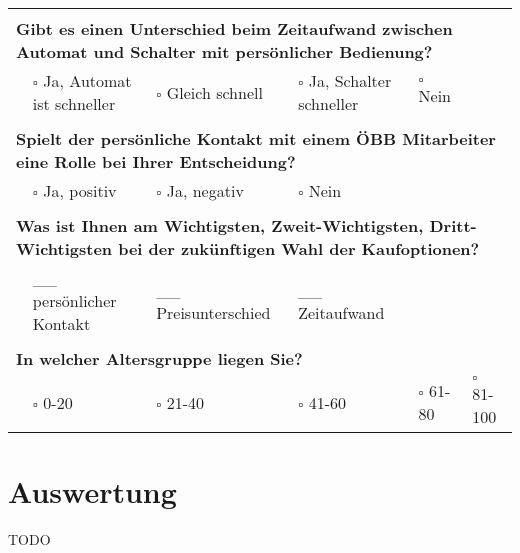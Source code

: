 \documentclass[]{article}
\begin{document}
\begin{landscape}
\begin{table}[h!]
\begin{tabular}{|llllll|}
		& & & & & \\ \hline
		& & & & & \\
		\multicolumn{6}{|l|}{\textbf{Gibt es einen Unterschied beim Zeitaufwand zwischen Automat und Schalter mit persönlicher Bedienung?}} \\ \hline
		& $\square$ Ja, Automat ist schneller & $\square$ Gleich schnell & $\square$ Ja, Schalter schneller & $\square$ Nein  &             \\ \hline
		& & & & & \\
		\multicolumn{6}{|l|}{\textbf{Spielt der persönliche Kontakt mit einem ÖBB Mitarbeiter eine Rolle bei Ihrer Entscheidung?}}          \\ \hline
		& $\square$ Ja, positiv & $\square$ Ja, negativ & $\square$ Nein &  &                                                               \\ \hline
		& & & & & \\
		\multicolumn{6}{|l|}{\textbf{Was ist Ihnen am Wichtigsten, Zweit-Wichtigsten, Dritt-Wichtigsten bei der zukünftigen Wahl der Kaufoptionen?}} \\ \hline
		& \_\_ persönlicher Kontakt       & \_\_ Preisunterschied          & \_\_ Zeitaufwand             &  &                              \\ \hline
		& & & & & \\
		\multicolumn{6}{|l|}{\textbf{In welcher Altersgruppe liegen Sie?}}                                                                  \\ \hline
		& $\square$ 0-20 & $\square$ 21-40 & $\square$ 41-60 & $\square$ 61-80 & $\square$ 81-100                                           \\ \hline
	\end{tabular}
\end{table}

\end{landscape}
\newpage
\restoregeometry

\section{Auswertung}
\label{sec:auswertung}

TODO

\newpage


\end{document}
